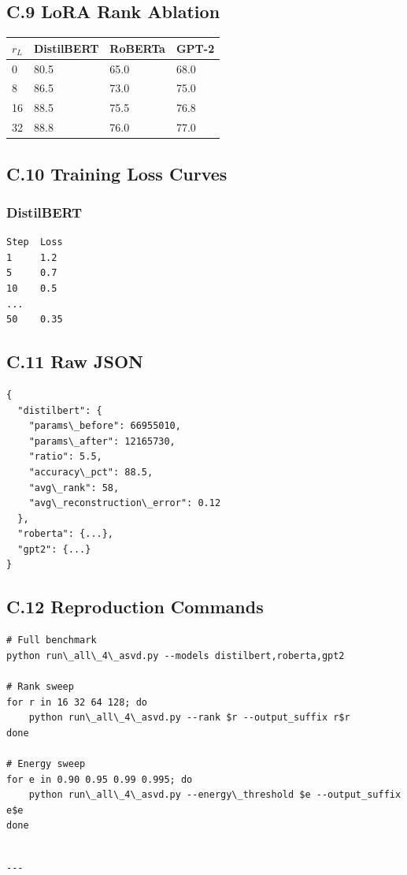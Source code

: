 \subsection{C.9 LoRA Rank Ablation}

\begin{table}[H]
\centering
\small
\begin{tabular}{llll}
\toprule
\textbf{$r_L$} & \textbf{DistilBERT} & \textbf{RoBERTa} & \textbf{GPT-2} \\
\midrule
0 & 80.5 & 65.0 & 68.0 \\
8 & 86.5 & 73.0 & 75.0 \\
16 & 88.5 & 75.5 & 76.8 \\
32 & 88.8 & 76.0 & 77.0 \\
\bottomrule
\end{tabular}
\end{table}

\subsection{C.10 Training Loss Curves}

\subsubsection{DistilBERT}
\begin{lstlisting}
Step  Loss
1     1.2
5     0.7
10    0.5
...
50    0.35
\end{lstlisting}

\subsection{C.11 Raw JSON}

\begin{lstlisting}
{
  "distilbert": {
    "params\_before": 66955010,
    "params\_after": 12165730,
    "ratio": 5.5,
    "accuracy\_pct": 88.5,
    "avg\_rank": 58,
    "avg\_reconstruction\_error": 0.12
  },
  "roberta": {...},
  "gpt2": {...}
}
\end{lstlisting}

\subsection{C.12 Reproduction Commands}

\begin{lstlisting}
# Full benchmark
python run\_all\_4\_asvd.py --models distilbert,roberta,gpt2

# Rank sweep
for r in 16 32 64 128; do
    python run\_all\_4\_asvd.py --rank $r --output_suffix r$r
done

# Energy sweep
for e in 0.90 0.95 0.99 0.995; do
    python run\_all\_4\_asvd.py --energy\_threshold $e --output_suffix e$e
done
\end{lstlisting}
\begin{lstlisting}

---
\end{lstlisting}